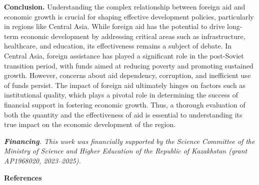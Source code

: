 {\bfseries Conclusion.} Understanding the complex relationship between
foreign aid and economic growth is crucial for shaping effective
development policies, particularly in regions like Central Asia. While
foreign aid has the potential to drive long-term economic development by
addressing critical areas such as infrastructure, healthcare, and
education, its effectiveness remains a subject of debate. In Central
Asia, foreign assistance has played a significant role in the
post-Soviet transition period, with funds aimed at reducing poverty and
promoting sustained growth. However, concerns about aid dependency,
corruption, and inefficient use of funds persist. The impact of foreign
aid ultimately hinges on factors such as institutional quality, which
plays a pivotal role in determining the success of financial support in
fostering economic growth. Thus, a thorough evaluation of both the
quantity and the effectiveness of aid is essential to understanding its
true impact on the economic development of the region.

\emph{{\bfseries Financing}. This work was financially supported by the
Science Committee of the Ministry of Science and Higher Education of the
Republic of Kazakhstan (grant AP1968020, 2023--2025).}

{\bfseries References}

